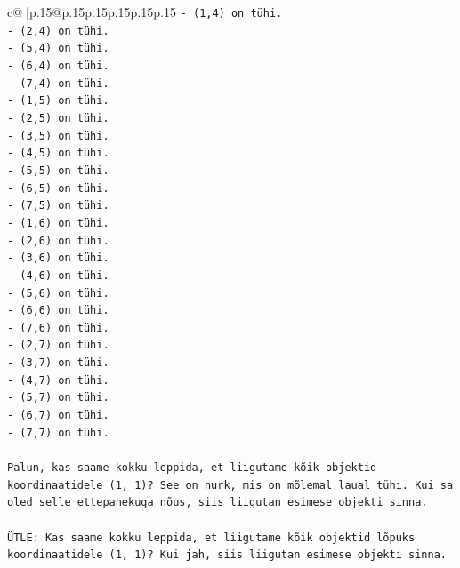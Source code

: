 \documentclass{article}
\begin{document}
{\begin{supertabular}{c@{$\;$}|p{.15\linewidth}@{}p{.15\linewidth}p{.15\linewidth}p{.15\linewidth}p{.15\linewidth}p{.15\linewidth}}
{{{\texttt{{-} (1,4) on tühi.} \\
\texttt{{-} (2,4) on tühi.} \\
\texttt{{-} (5,4) on tühi.} \\
\texttt{{-} (6,4) on tühi.} \\
\texttt{{-} (7,4) on tühi.} \\
\texttt{{-} (1,5) on tühi.} \\
\texttt{{-} (2,5) on tühi.} \\
\texttt{{-} (3,5) on tühi.} \\
\texttt{{-} (4,5) on tühi.} \\
\texttt{{-} (5,5) on tühi.} \\
\texttt{{-} (6,5) on tühi.} \\
\texttt{{-} (7,5) on tühi.} \\
\texttt{{-} (1,6) on tühi.} \\
\texttt{{-} (2,6) on tühi.} \\
\texttt{{-} (3,6) on tühi.} \\
\texttt{{-} (4,6) on tühi.} \\
\texttt{{-} (5,6) on tühi.} \\
\texttt{{-} (6,6) on tühi.} \\
\texttt{{-} (7,6) on tühi.} \\
\texttt{{-} (2,7) on tühi.} \\
\texttt{{-} (3,7) on tühi.} \\
\texttt{{-} (4,7) on tühi.} \\
\texttt{{-} (5,7) on tühi.} \\
\texttt{{-} (6,7) on tühi.} \\
\texttt{{-} (7,7) on tühi.} \\
\\ 
\texttt{Palun, kas saame kokku leppida, et liigutame kõik objektid koordinaatidele (1, 1)? See on nurk, mis on mõlemal laual tühi. Kui sa oled selle ettepanekuga nõus, siis liigutan esimese objekti sinna.} \\
\\ 
\texttt{ÜTLE: Kas saame kokku leppida, et liigutame kõik objektid lõpuks koordinaatidele (1, 1)? Kui jah, siis liigutan esimese objekti sinna.} \\
            }
        }
    }
     \\ \\


\end{supertabular}}
\end{document}

